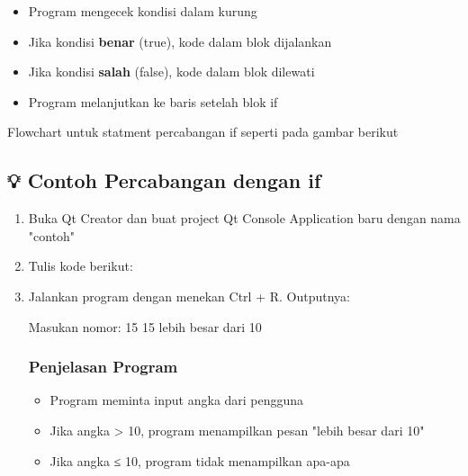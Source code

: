 \begin{itemize}
\item Program mengecek kondisi dalam kurung
\item Jika kondisi \textbf{benar} (true), kode dalam blok dijalankan
\item Jika kondisi \textbf{salah} (false), kode dalam blok dilewati
\item Program melanjutkan ke baris setelah blok if
\end{itemize}

Flowchart untuk statment percabangan if seperti pada gambar berikut




\subsection*{💡 Contoh Percabangan dengan if}

\begin{enumerate}
\item Buka Qt Creator dan buat project Qt Console Application baru dengan nama "contoh"
\item Tulis kode berikut:



\item Jalankan program dengan menekan Ctrl + R. Outputnya:

\begin{lcverbatim}
Masukan nomor: 15
15 lebih besar dari 10
\end{lcverbatim}

\subsubsection*{Penjelasan Program}
\begin{itemize}
\item Program meminta input angka dari pengguna
\item Jika angka > 10, program menampilkan pesan "lebih besar dari 10"
\item Jika angka ≤ 10, program tidak menampilkan apa-apa
\end{itemize}
\end{enumerate}
